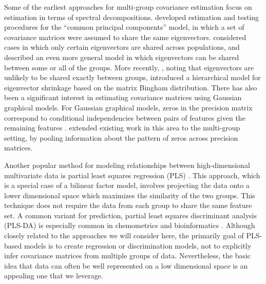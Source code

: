 \documentclass{statsoc}
\begin{document}
Some of the earliest approaches for multi-group covariance estimation
focus on estimation in terms of spectral decompositions.
\cite{Flury1987} developed estimation and testing procedures for the
``common principal components'' model, in which a set of covariance
matrices were assumed to share the same eigenvectors.
\citet{Schott1991, Schott1999} considered cases in which only certain
eigenvectors are shared across populations, and \citet{Boik2002}
described an even more general model in which eigenvectors can be
shared between some or all of the groups.  More recently,
\citet{Hoff2009}, noting that eigenvectors are unlikely to be shared
exactly between groups, introduced a hierarchical model for
eigenvector shrinkage based on the matrix Bingham distribution.  There
has also been a significant interest in estimating covariance matrices
using Gaussian graphical models. For Gaussian graphical models, zeros
in the precision matrix correspond to conditional independencies
between pairs of features given the remaining features
\citep{Meinshausen2006}.  \citet{Witten2014} extended existing work in
this area to the multi-group setting, by pooling information about the
pattern of zeros across precision matrices.


Another popular method for modeling relationships between
high-dimensional multivariate data is partial least squares regression
(PLS) \citep{Wold2001}. This approach, which is a special case of a bilinear factor
model, involves projecting the data onto a lower dimensional space which
maximizes the similarity of the two groups.  This technique does not
require the data from each group to share the same feature set.  A
common variant for prediction, partial least squares discriminant
analysis (PLS-DA) is especially common in chemometrics and
bioinformatics \citep{Barker2003}.  Although closely related to the
approaches we will consider here, the primarily goal of PLS-based
models is to create regression or discrimination models, not to
explicitly infer covariance matrices from multiple groups of data.
Nevertheless, the basic idea that data can often be well represented
on a low dimensional space is an appealing one that we leverage.
\end{document}
